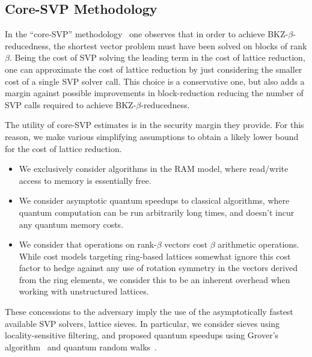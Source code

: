 \subsection{Core-SVP Methodology}

In the ``core-SVP'' methodology~\cite{USENIX:ADPS16} one observes that in order to achieve BKZ-$\beta$-reducedness, the shortest vector problem must have been solved on blocks of rank $\beta$. Being the cost of SVP solving the leading term in the cost of lattice reduction, one can approximate the cost of lattice reduction by just considering the smaller cost of a single SVP solver call. This choice is a conservative one, but also adds a margin against possible improvements in block-reduction reducing the number of SVP calls required to achieve BKZ-$\beta$-reducedness.

The utility of core-SVP estimates is in the security margin they provide. For this reason, we make various simplifying assumptions to obtain a likely lower bound for the cost of lattice reduction.
\begin{itemize}
	\item We exclusively consider algorithms in the RAM model, where read/write access to memory is essentially free.
	\item We consider asymptotic quantum speedups to classical algorithms, where quantum computation can be run arbitrarily long times, and doesn't incur any quantum memory costs.
	\item We consider that operations on rank-$\beta$ vectors cost $\beta$ arithmetic operations. While cost models targeting ring-based lattices somewhat ignore this cost factor to hedge against any use of rotation symmetry in the vectors derived from the ring elements, we consider this to be an inherent overhead when working with unstructured lattices.
\end{itemize}

These concessions to the adversary imply the use of the asymptotically fastest available SVP solvers, lattice sieves. In particular, we consider \cite{SODA:BDGL16} sieves using locality-sensitive filtering, and proposed quantum speedups using Grover's algorithm~\cite{AC:AGPS20} and quantum random walks~\cite{cryptoeprint:2024/1692}.

